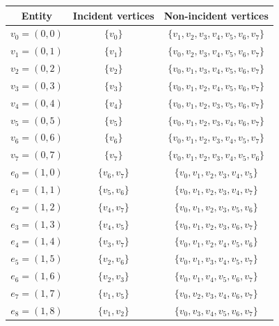 \vspace{-0.5cm}
\begin{table}[H]
\small
\linespread{1.2}\selectfont
  \begin{center}
    \begin{tabular}{|c|c|c|}
      \hline
      Entity & Incident vertices & Non-incident vertices \\
      \hline
      \hline
      $v_0 = (0, 0)$ & $\{v_0\}$ & $\{v_1, v_2, v_3, v_4, v_5, v_6, v_7\}$ \\
      \hline
      $v_1 = (0, 1)$ & $\{v_1\}$ & $\{v_0, v_2, v_3, v_4, v_5, v_6, v_7\}$ \\
      \hline
      $v_2 = (0, 2)$ & $\{v_2\}$ & $\{v_0, v_1, v_3, v_4, v_5, v_6, v_7\}$ \\
      \hline
      $v_3 = (0, 3)$ & $\{v_3\}$ & $\{v_0, v_1, v_2, v_4, v_5, v_6, v_7\}$ \\
      \hline
      $v_4 = (0, 4)$ & $\{v_4\}$ & $\{v_0, v_1, v_2, v_3, v_5, v_6, v_7\}$ \\
      \hline
      $v_5 = (0, 5)$ & $\{v_5\}$ & $\{v_0, v_1, v_2, v_3, v_4, v_6, v_7\}$ \\
      \hline
      $v_6 = (0, 6)$ & $\{v_6\}$ & $\{v_0, v_1, v_2, v_3, v_4, v_5, v_7\}$ \\
      \hline
      $v_7 = (0, 7)$ & $\{v_7\}$ & $\{v_0, v_1, v_2, v_3, v_4, v_5, v_6\}$ \\
      \hline
      $e_0 = (1, 0)$ & $\{v_6, v_7\}$ & $\{v_0, v_1, v_2, v_3, v_4, v_5\}$ \\
      \hline
      $e_1 = (1, 1)$ & $\{v_5, v_6\}$ & $\{v_0, v_1, v_2, v_3, v_4, v_7\}$ \\
      \hline
      $e_2 = (1, 2)$ & $\{v_4, v_7\}$ & $\{v_0, v_1, v_2, v_3, v_5, v_6\}$ \\
      \hline
      $e_3 = (1, 3)$ & $\{v_4, v_5\}$ & $\{v_0, v_1, v_2, v_3, v_6, v_7\}$ \\
      \hline
      $e_4 = (1, 4)$ & $\{v_3, v_7\}$ & $\{v_0, v_1, v_2, v_4, v_5, v_6\}$ \\
      \hline
      $e_5 = (1, 5)$ & $\{v_2, v_6\}$ & $\{v_0, v_1, v_3, v_4, v_5, v_7\}$ \\
      \hline
      $e_6 = (1, 6)$ & $\{v_2, v_3\}$ & $\{v_0, v_1, v_4, v_5, v_6, v_7\}$ \\
      \hline
      $e_7 = (1, 7)$ & $\{v_1, v_5\}$ & $\{v_0, v_2, v_3, v_4, v_6, v_7\}$ \\
      \hline
      $e_8 = (1, 8)$ & $\{v_1, v_2\}$ & $\{v_0, v_3, v_4, v_5, v_6, v_7\}$ \\

\end{tabular}
\end{center}
\end{table}
